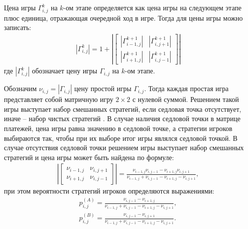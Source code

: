 Цена игры $\Gamma_{i,j}^{k}$ на $k$-ом этапе определяется как цена игры на следующем этапе плюс единица, отражающая очередной ход в игре. Тогда для цены игры можно записать:
\begin{equation}
    \begin{aligned}
        |\Gamma_{i,j}^{k}| = 1 + \left | \begin{bmatrix}
			|\Gamma_{i-1,j}^{k+1}| & |\Gamma_{i,j+1}^{k+1}| \\
			|\Gamma_{i+1,j}^{k+1}| & |\Gamma_{i,j-1}^{k+1}|
		\end{bmatrix} \right |
    \label{eq:game-payments}
    \end{aligned}
\end{equation}
где $|\Gamma_{i,j}^k|$ обозначает цену игры $\Gamma_{i,j}$ на $k$-ом этапе.

Обозначим $\nu_{i,j}=|\Gamma_{i,j}|$ цену простой игры $\Gamma_{i,j}$. Тогда каждая простая игра представляет собой матричную игру $2\times2$ с нулевой суммой. Решением такой игры выступает набор смешанных стратегий, если седловая точка отсутствует, иначе -- набор чистых стратегий \cite{ouen_teoriya_1971}. В случае наличия седловой точки в матрице платежей, цена игры равна значению в седловой точке, а стратегии игроков выбираются так, чтобы при их выборе итог игры являлся седловой точкой.
В случае отсутствия седловой точки решением игры выступает набор смешанных стратегий и цена игры может быть найдена по формуле:
\begin{equation}
    \begin{aligned}
        \left | \begin{bmatrix}
			\nu_{i-1,j} & \nu_{i,j+1} \\
			\nu_{i+1,j} & \nu_{i,j-1}
		\end{bmatrix} \right | = \frac{\nu_{i-1,j}\nu_{i,j-1} - \nu_{i+1,j}\nu_{i,j+1}}{\nu_{i-1,j} + \nu_{i,j-1} - \nu_{i+1,j} - \nu_{i,j+1}},
    \label{eq:game-2x2-value}
    \end{aligned}
\end{equation}
при этом вероятности стратегий игроков определяются выражениями:
\begin{equation}
    \begin{aligned}
        p_{i,j}^{(A)} = \frac{\nu_{i,j-1} - \nu_{i+1,j}}{\nu_{i-1,j} + \nu_{i,j-1} - \nu_{i+1,j} - \nu_{i,j+1}}, \\
        p_{i,j}^{(B)} = \frac{\nu_{i,j-1} - \nu_{i,j+1}}{\nu_{i-1,j} + \nu_{i,j-1} - \nu_{i+1,j} - \nu_{i,j+1}}.
    \label{eq:game-2x2-prob}
    \end{aligned}
\end{equation}

